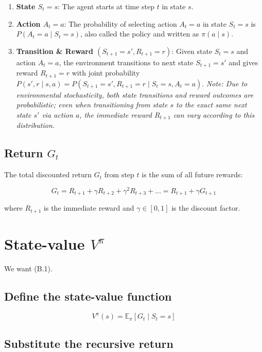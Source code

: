 \begin{enumerate}
\item \textbf{State $S_t = s$}: The agent starts at time step $t$ in state $s$.
\item \textbf{Action $A_t = a$}: The probability of selecting action $A_t = a$ in state $S_t = s$ is $P(A_t = a \mid S_t = s)$, also called the policy and written as $\pi(a \mid s)$.
\item \textbf{Transition \& Reward $(S_{t+1} = s', R_{t+1} = r)$}: Given state $S_t = s$ and action $A_t = a$, the environment transitions to next state $S_{t+1} = s'$ and gives reward $R_{t+1} = r$ with joint probability $P(s', r \mid s, a) = P(S_{t+1} = s', R_{t+1} = r \mid S_t = s, A_t = a)$. \textit{Note: Due to environmental stochasticity, both state transitions and reward outcomes are probabilistic; even when transitioning from state $s$ to the exact same next state $s'$ via action $a$, the immediate reward $R_{t+1}$ can vary according to this distribution.}
\end{enumerate}

\subsection{Return $G_t$}

The total discounted return $G_t$ from step $t$ is the sum of all future rewards:

\begin{equation}
G_t = R_{t+1} + \gamma R_{t+2} + \gamma^2 R_{t+3} + \dots = R_{t+1} + \gamma G_{t+1}
\tag{B.6}
\end{equation}

where $R_{t+1}$ is the immediate reward and $\gamma \in [0, 1]$ is the discount factor.

\section{State-value $V^\pi$}

We want (B.1).

\subsection{Define the state-value function}

\begin{equation}
V^\pi(s)
=
\mathbb{E}_\pi[G_t\mid S_t=s]
\tag{B.7}
\end{equation}

\subsection{Substitute the recursive return}


